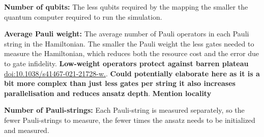 \documentclass[twoside]{article}
\begin{document}
\begin{romanlist}
\item \textbf{Number of qubits:} The less qubits required by the mapping the smaller the quantum computer required to run the simulation.
\item \textbf{Average Pauli weight:} The average number of Pauli operators in each Pauli string in the Hamiltonian. The smaller the Pauli weight the less gates needed to measure the Hamiltonian, which reduces both the resource cost and the error due to gate infidelity. \textbf{Low-weight operators protect against barren plateau} \url{doi:10.1038/s41467-021-21728-w.}. \textbf{Could potentially elaborate here as it is a bit more complex than just less gates per string it also increases parallelisation and reduces ansatz depth}. \textbf{Mention locality}
\item \textbf{Number of Pauli-strings:} Each Pauli-string is measured separately, so the fewer Pauli-strings to measure, the fewer times the ansatz needs to be initialized and measured.
\end{romanlist}
\end{document}
